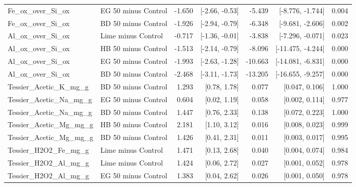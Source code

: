 \documentclass[preprint,12pt]{elsarticle}
\begin{document}
\begin{landscape}
\begin{longtable}{@{} >{\raggedright\arraybackslash}p{4.4cm} >{\raggedright\arraybackslash}p{4.0cm} r r r r r @{} }
Fe\_\allowbreak{}ox\_\allowbreak{}over\_\allowbreak{}Si\_\allowbreak{}ox & EG 50 minus Control & -1.650 & [-2.66, -0.53] & -5.439 & [-8.776, -1.744] & 0.004 \\
Fe\_\allowbreak{}ox\_\allowbreak{}over\_\allowbreak{}Si\_\allowbreak{}ox & BD 50 minus Control & -1.926 & [-2.94, -0.79] & -6.348 & [-9.681, -2.606] & 0.002 \\
Al\_\allowbreak{}ox\_\allowbreak{}over\_\allowbreak{}Si\_\allowbreak{}ox & Lime minus Control & -0.717 & [-1.36, -0.01] & -3.838 & [-7.296, -0.071] & 0.023 \\
Al\_\allowbreak{}ox\_\allowbreak{}over\_\allowbreak{}Si\_\allowbreak{}ox & HB 50 minus Control & -1.513 & [-2.14, -0.79] & -8.096 & [-11.475, -4.244] & 0.000 \\
Al\_\allowbreak{}ox\_\allowbreak{}over\_\allowbreak{}Si\_\allowbreak{}ox & EG 50 minus Control & -1.993 & [-2.63, -1.28] & -10.663 & [-14.081, -6.831] & 0.000 \\
Al\_\allowbreak{}ox\_\allowbreak{}over\_\allowbreak{}Si\_\allowbreak{}ox & BD 50 minus Control & -2.468 & [-3.11, -1.73] & -13.205 & [-16.655, -9.257] & 0.000 \\
Tessier\_\allowbreak{}Acetic\_\allowbreak{}K\_\allowbreak{}mg\_\allowbreak{}g & BD 50 minus Control & 1.293 & [0.78, 1.78] & 0.077 & [0.047, 0.106] & 1.000 \\
Tessier\_\allowbreak{}Acetic\_\allowbreak{}Na\_\allowbreak{}mg\_\allowbreak{}g & EG 50 minus Control & 0.604 & [0.02, 1.19] & 0.058 & [0.002, 0.114] & 0.977 \\
Tessier\_\allowbreak{}Acetic\_\allowbreak{}Na\_\allowbreak{}mg\_\allowbreak{}g & BD 50 minus Control & 1.447 & [0.76, 2.33] & 0.138 & [0.072, 0.223] & 1.000 \\
Tessier\_\allowbreak{}Acetic\_\allowbreak{}Mg\_\allowbreak{}mg\_\allowbreak{}g & HB 50 minus Control & 2.181 & [1.10, 3.12] & 0.016 & [0.008, 0.023] & 0.999 \\
Tessier\_\allowbreak{}Acetic\_\allowbreak{}Mg\_\allowbreak{}mg\_\allowbreak{}g & BD 50 minus Control & 1.426 & [0.41, 2.31] & 0.011 & [0.003, 0.017] & 0.995 \\
Tessier\_\allowbreak{}H2O2\_\allowbreak{}Fe\_\allowbreak{}mg\_\allowbreak{}g & Lime minus Control & 1.471 & [0.13, 2.68] & 0.040 & [0.004, 0.074] & 0.984 \\
Tessier\_\allowbreak{}H2O2\_\allowbreak{}Al\_\allowbreak{}mg\_\allowbreak{}g & Lime minus Control & 1.424 & [0.06, 2.72] & 0.027 & [0.001, 0.052] & 0.978 \\
Tessier\_\allowbreak{}H2O2\_\allowbreak{}Al\_\allowbreak{}mg\_\allowbreak{}g & EG 50 minus Control & 1.383 & [0.04, 2.62] & 0.026 & [0.001, 0.050] & 0.978 \\

\end{longtable}
\end{landscape}
\end{document}
